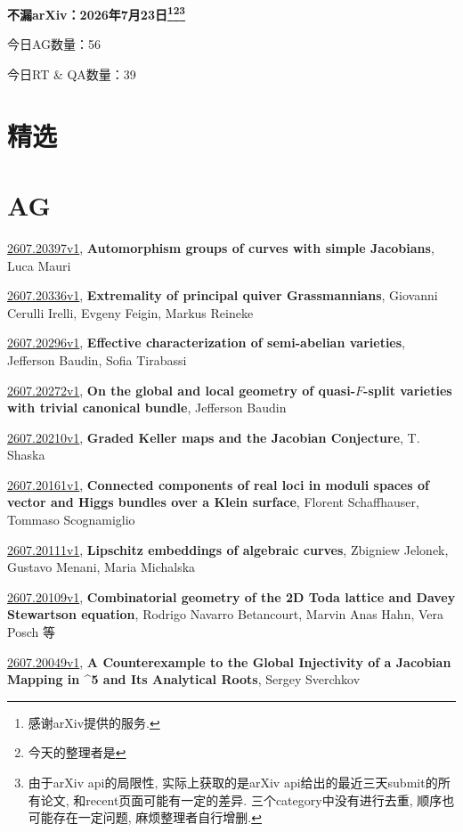 \documentclass[9pt, a4paper]{article}
\theoremstyle{plain}
\theoremstyle{definition}
\theoremstyle{remark}
\newcommand{\arxiv}[3]{\href{https://arxiv.org/abs/#1}{#1}, \textbf{\textcolor{arxivblue}{#2}}, #3}
\newcommand{\AGnumber}{56}
\newcommand{\RTQAnumber}{39}
\newcommand{\NewestDate}{2026年7月23日}
\newcommand{\todayarXiver}{} %
\begin{document}
\begin{center}
    \Huge\textbf{不漏arXiv：\NewestDate\footnote{感谢arXiv提供的服务.}\footnote{今天的整理者是\todayarXiver}\footnote{由于arXiv api的局限性, 实际上获取的是arXiv api给出的最近三天submit的所有论文, 和recent页面可能有一定的差异. 三个category中没有进行去重, 顺序也可能存在一定问题, 麻烦整理者自行增删.}} \\
\end{center}

\setcounter{section}{-1}

\begin{center}
    今日AG数量：\AGnumber
    
    今日RT \& QA数量：\RTQAnumber
    
\end{center}


\section{精选}


\section{AG}
\arxiv{2607.20397v1}{Automorphism groups of curves with simple Jacobians}{Luca Mauri}

\arxiv{2607.20336v1}{Extremality of principal quiver Grassmannians}{Giovanni Cerulli Irelli, Evgeny Feigin, Markus Reineke}

\arxiv{2607.20296v1}{Effective characterization of semi-abelian varieties}{Jefferson Baudin, Sofia Tirabassi}

\arxiv{2607.20272v1}{On the global and local geometry of quasi-$F$-split varieties with trivial canonical bundle}{Jefferson Baudin}

\arxiv{2607.20210v1}{Graded Keller maps and the Jacobian Conjecture}{T. Shaska}

\arxiv{2607.20161v1}{Connected components of real loci in moduli spaces of vector and Higgs bundles over a Klein surface}{Florent Schaffhauser, Tommaso Scognamiglio}

\arxiv{2607.20111v1}{Lipschitz embeddings of algebraic curves}{Zbigniew Jelonek, Gustavo Menani, Maria Michalska}

\arxiv{2607.20109v1}{Combinatorial geometry of the 2D Toda lattice and Davey Stewartson equation}{Rodrigo Navarro Betancourt, Marvin Anas Hahn, Vera Posch 等}

\arxiv{2607.20049v1}{A Counterexample to the Global Injectivity of a Jacobian Mapping in \mathbb{C}^5 and Its Analytical Roots}{Sergey Sverchkov}
\end{document}
